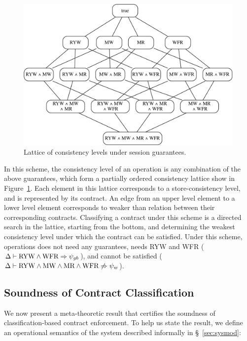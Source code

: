 \begin{figure}
\begin{center}
\includegraphics[width=\columnwidth]{Figures/lattice}
\end{center}
\caption{Lattice of consistency levels under session guarantees.}
\label{fig:lattice}
\end{figure}

In this scheme, the consistency level of an operation is any combination of the
above guarantees, which form a partially ordered consistency lattice show in
Figure~\ref{fig:lattice}. Each element in this lattice corresponds to a
store-consistency level, and is represented by its contract. An edge from an
upper level element to a lower level element corresponds to weaker than
relation between their corresponding contracts. Classifying a contract under
this scheme is a directed search in the lattice, starting from the bottom, and
determining the weakest consistency level under which the contract can be
satisfied. Under this scheme,  operations does not need any
guarantees,  needs RYW and WFR ($\Delta \vdash \textrm{RYW} \wedge
\textrm{WFR} \Rightarrow \psi_{gb}$), and  cannot be satisfied ($\Delta
\vdash \textrm{RYW} \wedge \textrm{MW} \wedge \textrm{MR} \wedge \textrm{WFR} \not\Rightarrow
\psi_{w}$).

\subsection{Soundness of Contract Classification}

We now present a meta-theoretic result that certifies the soundness of
classification-based contract enforcement. To help us state the result, we
define an operational semantics of the system described informally in
\S~\ref{sec:sysmod}:

